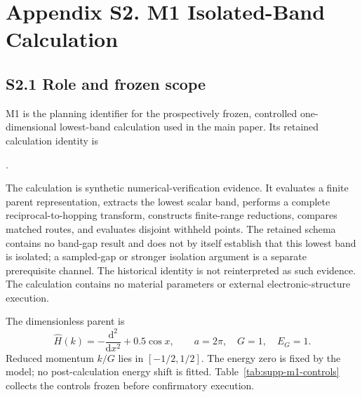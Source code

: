 \section*{Appendix S2. M1 Isolated-Band Calculation}
\label{supp:m1-isolated-band}
\renewcommand{\theequation}{S2.\arabic{equation}}
\setcounter{equation}{0}
\renewcommand{\thetable}{S2.\arabic{table}}
\setcounter{table}{0}

\subsection*{S2.1 Role and frozen scope}

M1 is the planning identifier for the prospectively frozen, controlled
one-dimensional lowest-band calculation used in the main paper. Its retained
calculation identity is
\begin{center}
.
\end{center}
The calculation is synthetic numerical-verification evidence. It evaluates a
finite parent representation, extracts the lowest scalar band, performs a
complete reciprocal-to-hopping transform, constructs finite-range reductions,
compares matched routes, and evaluates disjoint withheld points. The retained
schema contains no band-gap result and does not by itself establish that this
lowest band is isolated; a sampled-gap or stronger isolation argument is a
separate prerequisite channel. The historical identity is not reinterpreted as
such evidence. The calculation contains no material parameters or external
electronic-structure execution.

The dimensionless parent is
\begin{equation}
 \widehat H(k)=-\frac{\mathrm d^2}{\mathrm d x^2}+0.5\cos x,
 \qquad a=2\pi,\quad G=1,\quad E_G=1.
 \label{eq:supp-m1-parent}
\end{equation}
Reduced momentum $k/G$ lies in $[-1/2,1/2]$. The energy zero is fixed by the
model; no post-calculation energy shift is fitted. Table~\ref{tab:supp-m1-controls}
collects the controls frozen before confirmatory execution.

